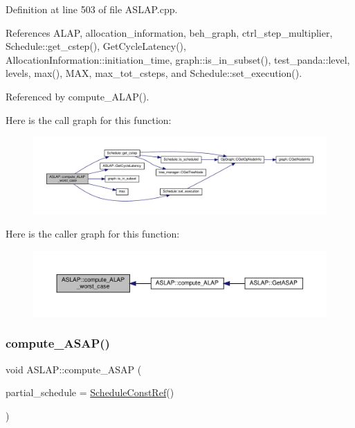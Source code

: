 Definition at line 503 of file A\+S\+L\+A\+P.\+cpp.



References A\+L\+AP, allocation\+\_\+information, beh\+\_\+graph, ctrl\+\_\+step\+\_\+multiplier, Schedule\+::get\+\_\+cstep(), Get\+Cycle\+Latency(), Allocation\+Information\+::initiation\+\_\+time, graph\+::is\+\_\+in\+\_\+subset(), test\+\_\+panda\+::level, levels, max(), M\+AX, max\+\_\+tot\+\_\+csteps, and Schedule\+::set\+\_\+execution().



Referenced by compute\+\_\+\+A\+L\+A\+P().

Here is the call graph for this function\+:
\nopagebreak
\begin{figure}[H]
\begin{center}
\leavevmode
\includegraphics[width=350pt]{d9/d2a/classASLAP_af0ad5c5a9402cfcfd511a3c3bb4b4f6f_cgraph}
\end{center}
\end{figure}
Here is the caller graph for this function\+:
\nopagebreak
\begin{figure}[H]
\begin{center}
\leavevmode
\includegraphics[width=350pt]{d9/d2a/classASLAP_af0ad5c5a9402cfcfd511a3c3bb4b4f6f_icgraph}
\end{center}
\end{figure}
\mbox{\label{classASLAP_ab4b7512adc6da387e14c20023b70b618}} 
\subsubsection{\texorpdfstring{compute\+\_\+\+A\+S\+A\+P()}{compute\_ASAP()}}
{\footnotesize\ttfamily void A\+S\+L\+A\+P\+::compute\+\_\+\+A\+S\+AP (\begin{DoxyParamCaption}\item[{const \hyperlink{schedule_8hpp_a85e4dea8a1611026193d8ca13fc5a260}{Schedule\+Const\+Ref}}]{partial\+\_\+schedule = {\ttfamily \hyperlink{schedule_8hpp_a85e4dea8a1611026193d8ca13fc5a260}{Schedule\+Const\+Ref}()} }\end{DoxyParamCaption})}



